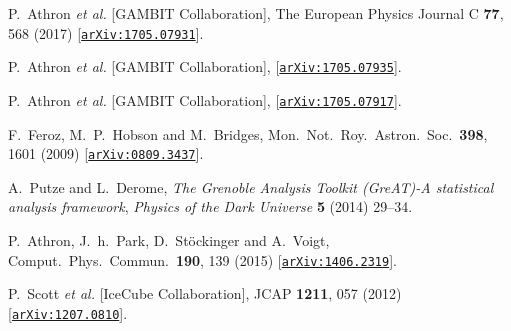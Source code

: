\documentclass{PoS}
\begin{document}
\begin{thebibliography}{99}
  P.~Athron {\it et al.} [GAMBIT Collaboration],
  The European Physics Journal C {\bf 77}, 568 (2017)
       [\href{http://arxiv.org/abs/1705.07931}{{\tt arXiv:1705.07931}}].

  P.~Athron {\it et al.} [GAMBIT Collaboration],
       [\href{http://arxiv.org/abs/1705.07935}{{\tt arXiv:1705.07935}}].

  P.~Athron {\it et al.} [GAMBIT Collaboration],
       [\href{http://arxiv.org/abs/1705.07917}{{\tt arXiv:1705.07917}}].


  F.~Feroz, M.~P.~Hobson and M.~Bridges,
  Mon.\ Not.\ Roy.\ Astron.\ Soc.\  {\bf 398}, 1601 (2009)
         [\href{http://arxiv.org/abs/0809.3437}{{\tt arXiv:0809.3437}}].
  
A.~{Putze} and L.~{Derome}, {\it {The Grenoble Analysis Toolkit (GreAT)-A
  statistical analysis framework}},  {\em Physics of the Dark Universe} {\bf 5}
  (2014) 29--34.

  P.~Athron, J.~h.~Park, D.~St\"ockinger and A.~Voigt,
  Comput.\ Phys.\ Commun.\  {\bf 190}, 139 (2015)
       [\href{http://arxiv.org/abs/1406.2319}{{\tt arXiv:1406.2319}}].

  P.~Scott {\it et al.} [IceCube Collaboration],
  JCAP {\bf 1211}, 057 (2012)
       [\href{http://arxiv.org/abs/1207.0810}{{\tt arXiv:1207.0810}}].
  

\end{thebibliography}
\end{document}
